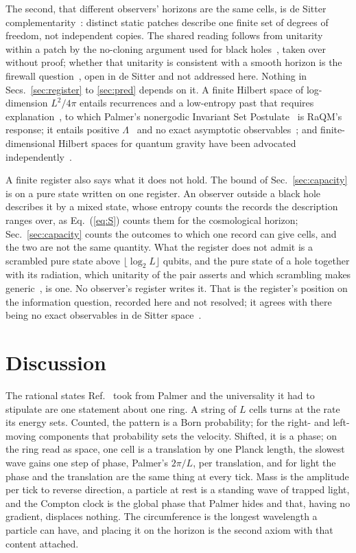 \documentclass[aps,prd,twocolumn,superscriptaddress,nofootinbib]{revtex4-2}
\begin{document}
The second, that different observers' horizons are the same cells, is de Sitter complementarity~\cite{susskind1993,bousso1999,dyson2002,banksfischler2001,parikh2003}: distinct static patches describe one finite set of degrees of freedom, not independent copies. The shared reading follows from unitarity within a patch by the no-cloning argument used for black holes~\cite{susskind1994,wootters1982}, taken over without proof; whether that unitarity is consistent with a smooth horizon is the firewall question~\cite{amps2013}, open in de Sitter and not addressed here. Nothing in Secs.~\ref{sec:register} to \ref{sec:pred} depends on it. A finite Hilbert space of log-dimension $L^2/4\pi$ entails recurrences and a low-entropy past that requires explanation~\cite{dyson2002}, to which Palmer's nonergodic Invariant Set Postulate~\cite{palmer2009} is RaQM's response; it entails positive $\Lambda$~\cite{banks2000} and no exact asymptotic observables~\cite{witten2001}; and finite-dimensional Hilbert spaces for quantum gravity have been advocated independently~\cite{buniy2005,bao2017,carroll2023}.

A finite register also says what it does not hold. The bound of Sec.~\ref{sec:capacity} is on a pure state written on one register. An observer outside a black hole describes it by a mixed state, whose entropy counts the records the description ranges over, as Eq.~(\ref{eq:S}) counts them for the cosmological horizon; Sec.~\ref{sec:capacity} counts the outcomes to which one record can give cells, and the two are not the same quantity. What the register does not admit is a scrambled pure state above $\lfloor\log_2 L\rfloor$ qubits, and the pure state of a hole together with its radiation, which unitarity of the pair asserts and which scrambling makes generic~\cite{sekino2008}, is one. No observer's register writes it. That is the register's position on the information question, recorded here and not resolved; it agrees with there being no exact observables in de Sitter space~\cite{witten2001}.

\section{Discussion}
\label{sec:discussion}

The rational states Ref.~\cite{korytko2026} took from Palmer and the universality it had to stipulate are one statement about one ring. A string of $L$ cells turns at the rate its energy sets. Counted, the pattern is a Born probability; for the right- and left-moving components that probability sets the velocity. Shifted, it is a phase; on the ring read as space, one cell is a translation by one Planck length, the slowest wave gains one step of phase, Palmer's $2\pi/L$, per translation, and for light the phase and the translation are the same thing at every tick. Mass is the amplitude per tick to reverse direction, a particle at rest is a standing wave of trapped light, and the Compton clock is the global phase that Palmer hides and that, having no gradient, displaces nothing. The circumference is the longest wavelength a particle can have, and placing it on the horizon is the second axiom with that content attached.
\end{document}
